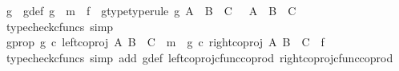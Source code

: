 \begin{isabellebody}
\ g\ \ g{\isacharunderscore}{\kern0pt}def{\isacharcolon}{\kern0pt}\ {\isachardoublequoteopen}g\ {\isacharequal}{\kern0pt}\ m\ {\isasymamalg}\ f{\isachardoublequoteclose}\ \ g{\isacharunderscore}{\kern0pt}type{\isacharbrackleft}{\kern0pt}type{\isacharunderscore}{\kern0pt}rule{\isacharbrackright}{\kern0pt}{\isacharcolon}{\kern0pt}\ {\isachardoublequoteopen}g{\isacharcolon}{\kern0pt}\ A\ {\isasymCoprod}\ {\isacharparenleft}{\kern0pt}B\ {\isasymCoprod}\ C{\isacharparenright}{\kern0pt}\ \ {\isasymrightarrow}\ {\isacharparenleft}{\kern0pt}A\ {\isasymCoprod}\ B{\isacharparenright}{\kern0pt}\ {\isasymCoprod}\ C{\isachardoublequoteclose}\isanewline
\ \ \ \ \isamarkupfalse%
\ {\isacharparenleft}{\kern0pt}typecheck{\isacharunderscore}{\kern0pt}cfuncs{\isacharcomma}{\kern0pt}\ simp{\isacharparenright}{\kern0pt}\isanewline
\ \ \isamarkupfalse%
\ g{\isacharunderscore}{\kern0pt}prop{\isacharcolon}{\kern0pt}\ {\isachardoublequoteopen}{\isacharparenleft}{\kern0pt}g\ {\isasymcirc}\isactrlsub c\ {\isacharparenleft}{\kern0pt}left{\isacharunderscore}{\kern0pt}coproj\ A\ {\isacharparenleft}{\kern0pt}B\ {\isasymCoprod}\ C{\isacharparenright}{\kern0pt}{\isacharparenright}{\kern0pt}\ {\isacharequal}{\kern0pt}\ m{\isacharparenright}{\kern0pt}\ {\isasymand}\ {\isacharparenleft}{\kern0pt}g\ {\isasymcirc}\isactrlsub c\ {\isacharparenleft}{\kern0pt}right{\isacharunderscore}{\kern0pt}coproj\ A\ {\isacharparenleft}{\kern0pt}B\ {\isasymCoprod}\ C{\isacharparenright}{\kern0pt}{\isacharparenright}{\kern0pt}\ {\isacharequal}{\kern0pt}\ f{\isacharparenright}{\kern0pt}{\isachardoublequoteclose}\isanewline
\ \ \ \ \isamarkupfalse%
\ {\isacharparenleft}{\kern0pt}typecheck{\isacharunderscore}{\kern0pt}cfuncs{\isacharcomma}{\kern0pt}\ simp\ add{\isacharcolon}{\kern0pt}\ g{\isacharunderscore}{\kern0pt}def\ left{\isacharunderscore}{\kern0pt}coproj{\isacharunderscore}{\kern0pt}cfunc{\isacharunderscore}{\kern0pt}coprod\ right{\isacharunderscore}{\kern0pt}coproj{\isacharunderscore}{\kern0pt}cfunc{\isacharunderscore}{\kern0pt}coprod{\isacharparenright}{\kern0pt}\ \isanewline
\ \ \isamarkupfalse%

\end{isabellebody}
